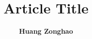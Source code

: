 \documentclass[draft, 11pt, letterpaper]{article}
\begin{document}
\title{\textbf {Article Title}}
\author{\textbf{Huang Zonghao}}
\maketitle
\end{document}
